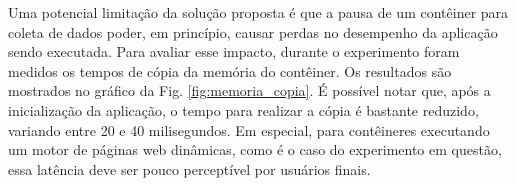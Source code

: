 \documentclass[conference]{IEEEtran}
\newcommand{\marcos}[1]{{\color{blue}{MARCOS: #1}}}
\begin{document}

%
%
%

Uma potencial limitação da solução proposta é que a pausa de um contêiner para coleta de dados poder, em princípio, causar perdas no desempenho da aplicação sendo executada. 
%
Para avaliar esse impacto, durante o experimento foram medidos os tempos de cópia da memória do contêiner.
%
Os resultados são mostrados no gráfico da Fig. \ref{fig:memoria_copia}.
%
É possível notar que, após a inicialização da aplicação, o tempo para realizar a cópia é bastante reduzido, variando entre 20 e 40 milisegundos. 
%
Em especial, para contêineres executando um motor de páginas web dinâmicas, como é o caso do experimento em questão, essa latência deve ser pouco perceptível por usuários finais.
\end{document}
